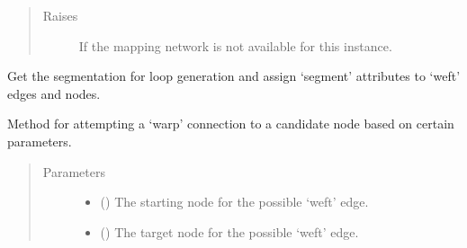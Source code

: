 \documentclass[letterpaper,10pt,english]{sphinxmanual}
\begin{document}
\begin{fulllineitems}
\begin{fulllineitems}
\begin{quote}
\begin{description}
\item[{Raises}] \leavevmode
{\hyperref[\detokenize{cockatoo:cockatoo.exception.MappingNetworkError}]{}} \textendash{} If the mapping network is not available for this instance.

\end{description}\end{quote}

\end{fulllineitems}


\begin{fulllineitems}
\label{\detokenize{cockatoo:cockatoo.KnitNetwork.assign_segment_attributes}}
Get the segmentation for loop generation and assign ‘segment’
attributes to ‘weft’ edges and nodes.

\end{fulllineitems}


\begin{fulllineitems}
\label{\detokenize{cockatoo:cockatoo.KnitNetwork.attempt_warp_connection}}
Method for attempting a ‘warp’ connection to a candidate
node based on certain parameters.
\begin{quote}\begin{description}
\item[{Parameters}] \leavevmode\begin{itemize}
\item {} 
 () \textendash{} The starting node for the possible ‘weft’ edge.

\item {} 
 () \textendash{} The target node for the possible ‘weft’ edge.


\end{itemize}
\end{description}
\end{quote}
\end{fulllineitems}
\end{fulllineitems}
\end{document}
